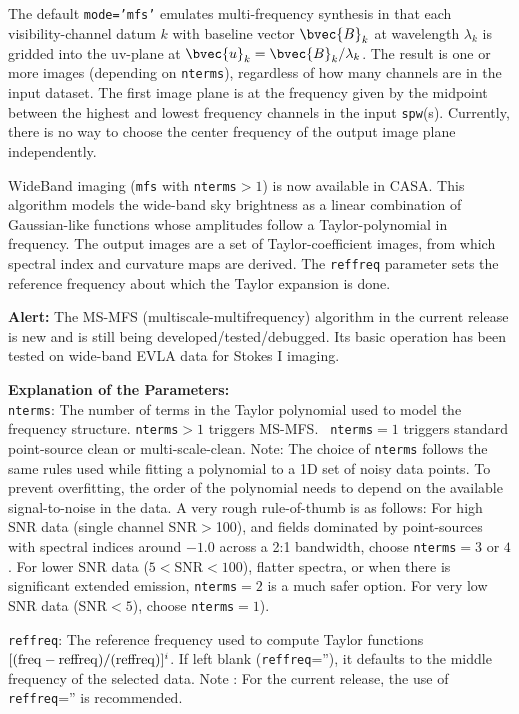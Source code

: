 The default {\tt mode='mfs'} emulates multi-frequency synthesis in
that each visibility-channel datum $k$ with baseline vector
$\bvec{B}_k$ at wavelength $\lambda_k$ is gridded into the uv-plane at
$\bvec{u}_k = \bvec{B}_k/\lambda_k$.  The result is one or more images
(depending on {\tt nterms}), regardless of how many channels are in the input dataset.
The first image plane is at the frequency given by the midpoint between
the highest and lowest frequency channels in the input {\tt spw}(s).
Currently, there is no way to choose the center frequency of the 
output image plane independently.

WideBand imaging ({\tt mfs} with {\tt nterms}$>1$) is now available in
CASA. This algorithm models the wide-band sky brightness as a linear
combination of Gaussian-like functions whose amplitudes follow a
Taylor-polynomial in frequency.  The output images are a set of
Taylor-coefficient images, from which spectral index and curvature
maps are derived. The {\tt reffreq} parameter sets the reference
frequency about which the Taylor expansion is done.

{\bf Alert:} The MS-MFS (multiscale-multifrequency) algorithm in the
current release is new and is still being
developed/tested/debugged. Its basic operation has been tested on
wide-band EVLA data for Stokes I imaging.

{\bf Explanation of the Parameters:} \\
{\tt nterms}: The number of terms in the Taylor polynomial used to
model the frequency structure.  {\tt nterms}$>1$ triggers MS-MFS. {\tt
  nterms}$=1$ triggers standard point-source clean or
multi-scale-clean.  Note: The choice of {\tt nterms} follows the same
rules used while fitting a polynomial to a 1D set of noisy data
points. To prevent overfitting, the order of the polynomial needs to
depend on the available signal-to-noise in the data.  A very rough
rule-of-thumb is as follows: For high SNR data (single channel
SNR$>$100), and fields dominated by point-sources with spectral
indices around $-1.0$ across a 2:1 bandwidth, choose {\tt nterms}$=3$
or $4$. For lower SNR data ($5<$SNR$<100$), flatter spectra, or when
there is significant extended emission, {\tt nterms}$=2$ is a much
safer option. For very low SNR data (SNR$<5$), choose {\tt nterms}$=1$).



{\tt reffreq}: The reference frequency used to compute Taylor
functions $[ ({\rm freq} - {\rm reffreq})/({\rm reffreq}) ]^{i}$.  If
left blank ({\tt reffreq}=''), it defaults to the middle frequency of
the selected data.  Note : For the current release, the use of {\tt
  reffreq}='' is recommended.




